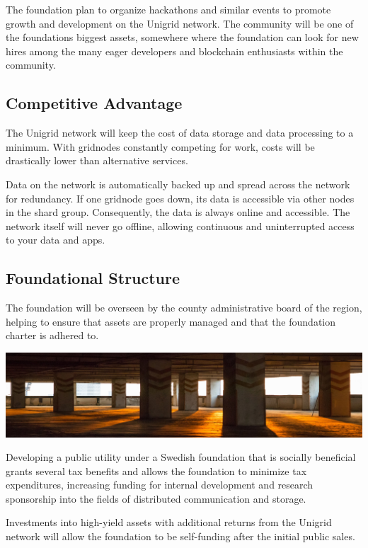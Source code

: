 \documentclass[a4paper,oneside]{article}
\begin{document}
The foundation plan to organize hackathons and similar events to promote growth and development on the Unigrid network. The community will be one of the foundations biggest assets, somewhere where the foundation can look for new hires among the many eager developers and blockchain enthusiasts within the community.

\subsection{Competitive Advantage}
The Unigrid network will keep the cost of data storage and data processing to a minimum. With gridnodes constantly competing for work, costs will be drastically lower than alternative services.

\noindent Data on the network is automatically backed up and spread across the network for redundancy. If one gridnode goes down, its data is accessible via other nodes in the shard group. Consequently, the data is always online and accessible. The network itself will never go offline, allowing continuous and uninterrupted access to your data and apps.

\subsection{Foundational Structure}
The foundation will be overseen by the county administrative board of the region, helping to ensure that assets are properly managed and that the foundation charter is adhered to.

\vspace{0.05cm}
\begin{mdframed}[style=textimage]
	\includegraphics[width=381pt]{foundation}
\end{mdframed}

\noindent Developing a public utility under a Swedish foundation that is socially beneficial grants several tax benefits and allows the foundation to minimize tax expenditures, increasing funding for internal development and research sponsorship into the fields of distributed communication and storage.

Investments into high-yield assets with additional returns from the Unigrid network will allow the foundation to be self-funding after the initial public sales.
\end{document}
